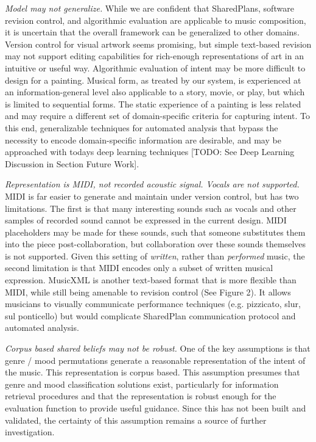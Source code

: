 \documentclass[final,authoryear,5p,times,twocolumn]{elsarticle}
\begin{document}
\textit{Model may not generalize.} While we are confident that SharedPlans, software revision control, and algorithmic evaluation are applicable to music composition, it is uncertain that the overall framework can be generalized to other domains. Version control for visual artwork seems promising, but simple text-based revision may not support editing capabilities for rich-enough representations of art in an intuitive or useful way.  Algorithmic evaluation of intent may be more difficult to design for a painting. Musical form, as treated by our system, is experienced at an information-general level also applicable to a story, movie, or play, but which is limited to sequential forms. The static experience of a painting is less related and may require a different set of domain-specific criteria for capturing intent. To this end, generalizable techniques for automated analysis that bypass the necessity to encode domain-specific information are desirable, and may be approached with todays deep learning techniques [TODO: See Deep Learning Discussion in Section Future Work].

\textit{Representation is MIDI, not recorded acoustic signal. Vocals are not supported.} MIDI is far easier to generate and maintain under version control, but has two limitations. The first is that many interesting sounds such as vocals and other samples of recorded sound cannot be expressed in the current design. MIDI placeholders may be made for these sounds, such that someone substitutes them into the piece post-collaboration, but collaboration over these sounds themselves is not supported. Given this setting of \textit{written}, rather than \textit{performed} music, the second limitation is that MIDI encodes only a subset of written musical expression. MusicXML is another text-based format that is more flexible than MIDI, while still being amenable to revision control (See Figure 2). It allows musicians to visually communicate performance techniques (e.g. pizzicato, slur, sul ponticello) but would complicate SharedPlan communication protocol and automated analysis.

\textit{Corpus based shared beliefs may not be robust.} One of the key assumptions is that genre / mood permutations generate a reasonable representation of the intent of the music. This representation is corpus based. This assumption presumes that genre and mood classification solutions exist, particularly for information retrieval procedures and that the representation is robust enough for the evaluation function to provide useful guidance. Since this has not been built and validated, the certainty of this assumption remains a source of further investigation.
\end{document}
